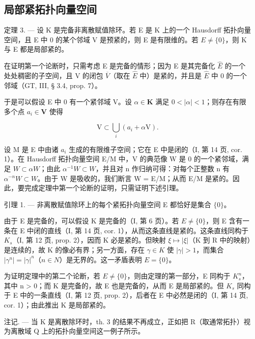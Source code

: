 \subsection{局部紧拓扑向量空间}

定理 3. --- 设 K 是完备非离散赋值除环。若 E 是 K 上的一个 Hausdorff 拓扑向量空间，且 E 中 0 的某个邻域 V 是预紧的，则 E 是有限维的。若 \(E \neq \{0\}\)，则 K 与 E 都是局部紧的。

在证明第一个论断时，只需考虑 E 是完备的情形；因为 E 是其完备化 \(\hat{E}\) 的一个处处稠密的子空间，且 V 的闭包 \(\overline{V}\)（取在 \(\hat{E}\) 中）是紧的，并且是 \(\hat{E}\) 中 0 的一个邻域（GT, III, § 3.4, prop. 7）。

于是可以假设 E 中 0 有一个紧邻域 V。设 \(\alpha \in \mathbf{K}\) 满足 \(0 < |\alpha| < 1\)；则存在有限多个点 \(a_i \in \mathbf{V}\) 使得

\[
\mathrm{V} \subset \bigcup_ {i} (a _ {i} + \alpha \mathrm{V}).
\]

设 M 是 E 中由诸 \(a_{i}\) 生成的有限维子空间；它在 E 中是闭的（I, 第 14 页, cor. 1）。在 Hausdorff 拓扑向量空间 E/M 中，V 的典范像 W 是 0 的一个紧邻域，满足 \(W \subset \alpha W\)；由此 \(\alpha^{-1} W \subset W\)，并且对 n 作归纳可得：对每个正整数 n 有 \(\alpha^{-n} W \subset W\)。由于 W 是吸收的，我们断言 W = E/M；从而 E/M 是紧的。因此，要完成定理中第一个论断的证明，只需证明下述引理。

引理 1. --- 非离散赋值除环上的每个紧拓扑向量空间 E 都恰好是集合 \(\{0\}\)。

由于 E 是完备的，可以假设 K 是完备的（I, 第 6 页）。若 \(E \neq \{0\}\)，则 E 含有一条在 E 中闭的直线（I, 第 14 页, cor. 1），从而这条直线是紧的。这条直线同构于 \(K_{s}\)（I, 第 12 页, prop. 2），因而 K 必是紧的。但映射 \(\xi \mapsto |\xi|\)（K 到 R 中的映射）是连续的，故 K 的像必有界；另一方面，存在 \(\gamma \in K\) 使 \(|\gamma| > 1\)，而集合 \(|\gamma^{n}| = |\gamma|^{n}\)（\(n \in N\)）是无界的。这一矛盾表明 \(E = \{0\}\)。

为证明定理中的第二个论断，若 \(E \neq \{0\}\)，则由定理的第一部分，E 同构于 \(K_{s}^{n}\)，其中 n \textgreater{} 0；而 K 是完备的，故 E 也是完备的，从而 E 是局部紧的。但 \(K_{s}\) 同构于 E 中的一条直线（I, 第 12 页, prop. 2），后者在 E 中必然是闭的（I, 第 14 页, cor. 1）；由此推出 K 是局部紧的。

注记. --- 当 K 是离散除环时，th. 3 的结果不再成立，正如把 R（取通常拓扑）视为离散域 Q 上的拓扑向量空间这一例子所示。

